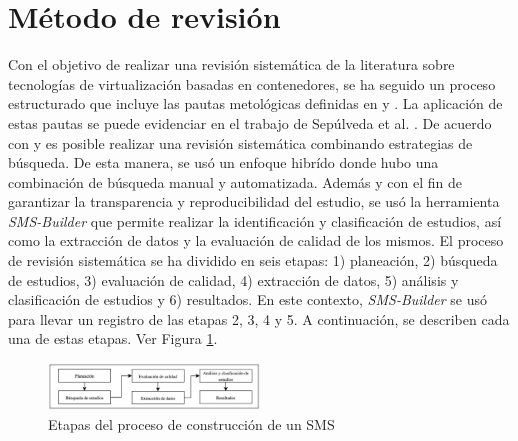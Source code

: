 \section{Método de revisión}
Con el objetivo de realizar una revisión sistemática de la literatura sobre tecnologías de virtualización basadas en contenedores, se ha seguido un proceso estructurado que incluye las pautas metológicas definidas en \cite{Runeson2009} y \cite{Kitchenham2010}.
La aplicación de estas pautas se puede evidenciar en el trabajo de Sepúlveda et al. \cite{Sepulveda-Rodriguez2021}. De acuerdo con \cite{Mourao2017} y \cite{Nguyen2015} es posible realizar una revisión sistemática combinando estrategias de búsqueda. De esta manera, se usó un enfoque hibrído donde hubo una combinación de búsqueda manual y automatizada. 
Además y con el fin de garantizar la transparencia y reproducibilidad del estudio, se usó la herramienta \textit{SMS-Builder} \cite{Candela-Uribe2022} que permite realizar la identificación y clasificación de estudios, así como la extracción de datos y la evaluación de calidad de los mismos.
El proceso de revisión sistemática se ha dividido en seis etapas: 1) planeación, 2) búsqueda de estudios, 3) evaluación de calidad, 4) extracción de datos, 5) análisis y clasificación de estudios y 6) resultados. En este contexto, \textit{SMS-Builder} se usó para llevar un registro de las etapas 2, 3, 4 y 5. A continuación, se describen cada una de estas etapas. Ver Figura \ref{fig:etapas}.


\begin{figure}[htbp]
    \centering
    \includegraphics[width=0.5\textwidth]{resources/images/planeacion/planeacion.png}
    \caption{Etapas del proceso de construcción de un SMS}\label{fig:etapas}
\end{figure}












